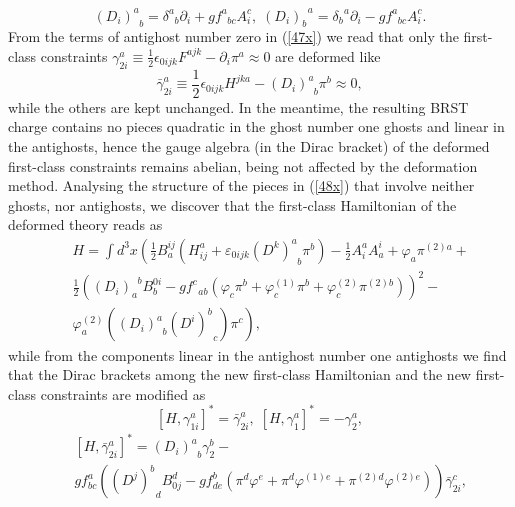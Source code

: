 \documentclass[a4paper,12pt]{article}
\begin{document}
\begin{equation}
\left( D_{i}\right) _{\;\;b}^{a}=\delta _{\;\;b}^{a}\partial
_{i}+gf_{\;\;bc}^{a}A_{i}^{c},\;\left( D_{i}\right) _{b}^{\;\;a}=\delta
_{b}^{\;\;a}\partial _{i}-gf_{\;\;bc}^{a}A_{i}^{c}.  \label{51x}
\end{equation}
From the terms of antighost number zero in (\ref{47x}) we read that only the
first-class constraints $\gamma _{2i}^{a}\equiv \frac{1}{2}\epsilon
_{0ijk}F^{ajk}-\partial _{i}\pi ^{a}\approx 0$ are deformed like 
\begin{equation}
\bar{\gamma}_{2i}^{a}\equiv \frac{1}{2}\epsilon _{0ijk}H^{jka}-\left(
D_{i}\right) _{\;\;b}^{a}\pi ^{b}\approx 0,  \label{52x}
\end{equation}
while the others are kept unchanged. In the meantime, the resulting BRST
charge contains no pieces quadratic in the ghost number one ghosts and
linear in the antighosts, hence the gauge algebra (in the Dirac bracket) of
the deformed first-class constraints remains abelian, being not affected by
the deformation method. Analysing the structure of the pieces in (\ref{48x})
that involve neither ghosts, nor antighosts, we discover that the
first-class Hamiltonian of the deformed theory reads as 
\begin{eqnarray}
&&H=\int d^{3}x\left( \frac{1}{2}B_{a}^{ij}\left( H_{ij}^{a}+\varepsilon
_{0ijk}\left( D^{k}\right) _{\;\;b}^{a}\pi ^{b}\right) -\frac{1}{2}%
A_{i}^{a}A_{a}^{i}+\varphi _{a}\pi ^{(2)a}+\right.  \nonumber \\
&&\frac{1}{2}\left( \left( D_{i}\right)
_{a}^{\;\;b}B_{b}^{0i}-gf_{\;\;ab}^{c}\left( \varphi _{c}\pi ^{b}+\varphi
_{c}^{(1)}\pi ^{b}+\varphi _{c}^{(2)}\pi ^{(2)b}\right) \right) ^{2}- 
\nonumber \\
&&\left. \varphi _{a}^{(2)}\left( \left( D_{i}\right) _{\;\;b}^{a}\left(
D^{i}\right) _{\;\;c}^{b}\right) \pi ^{c}\right) ,  \label{53x}
\end{eqnarray}
while from the components linear in the antighost number one antighosts we
find that the Dirac brackets among the new first-class Hamiltonian and the
new first-class constraints are modified as 
\begin{equation}
\left[ H,\gamma _{1i}^{a}\right] ^{*}=\bar{\gamma}_{2i}^{a},\;\left[
H,\gamma _{1}^{a}\right] ^{*}=-\gamma _{2}^{a},  \label{54x}
\end{equation}
\begin{eqnarray}
&&\left[ H,\bar{\gamma}_{2i}^{a}\right] ^{*}=\left( D_{i}\right)
_{\;\;b}^{a}\gamma _{2}^{b}-  \nonumber \\
&&gf_{bc}^{a}\left( \left( D^{j}\right)
_{\;\;d}^{b}B_{0j}^{d}-gf_{de}^{b}\left( \pi ^{d}\varphi ^{e}+\pi
^{d}\varphi ^{(1)e}+\pi ^{(2)d}\varphi ^{(2)e}\right) \right) \bar{\gamma}%
_{2i}^{c},  \label{55x}
\end{eqnarray}
\end{document}
